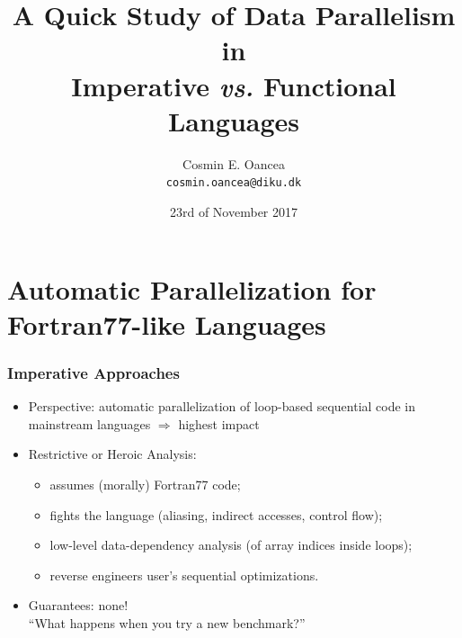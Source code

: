 \documentclass{beamer}
\title[]{A Quick Study of Data Parallelism in\\
        Imperative {\em vs.} Functional Languages}
\author[]{Cosmin E. Oancea\\{\tt cosmin.oancea@diku.dk}}
\institute{Department of Computer Science (DIKU)\\University of Copenhagen}
\date[23/11/2017]{23rd of November 2017}
\newcommand{\emphh}[1]{\textcolor{CosGreen}{ #1}}
\begin{document}
\titleslide

\begin{frame}[fragile]
	\tableofcontents
\end{frame}


\section{Automatic Parallelization for Fortran77-like Languages}

\begin{frame}[fragile,t]
  \frametitle{Imperative Approaches}

\begin{itemize}
    \item \emphh{Perspective:}
        automatic parallelization of loop-based sequential code 
        in mainstream languages $\Rightarrow$ highest impact
    \bigskip 

    \item \emphh{Restrictive or Heroic Analysis:}
        \begin{itemize}
            \item assumes (morally) Fortran77 code;            
            \item fights the language (aliasing, 
                    indirect accesses, control flow);
            \item low-level data-dependency analysis
                    (of array indices inside loops); 
            \item reverse engineers user's sequential
                    optimizations.
        \end{itemize}
    \bigskip

    \item \emphh{Guarantees:} none!\\
        ``What happens when you try a new benchmark?''
    \bigskip
\end{itemize}

\end{frame}
\end{document}
